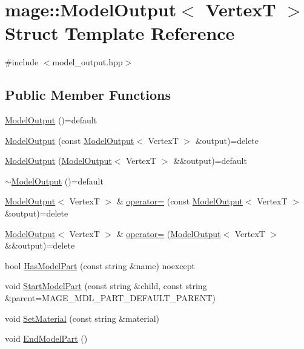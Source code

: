 \hypertarget{structmage_1_1_model_output}{}\section{mage\+:\+:Model\+Output$<$ VertexT $>$ Struct Template Reference}
\label{structmage_1_1_model_output}


{\ttfamily \#include $<$model\+\_\+output.\+hpp$>$}

\subsection*{Public Member Functions}
\begin{DoxyCompactItemize}
\item 
\hyperlink{structmage_1_1_model_output_a7d64b57d8207968541eb9c6da6ef0163}{Model\+Output} ()=default
\item 
\hyperlink{structmage_1_1_model_output_aac808e40a66f33da4ea28ebb7443623d}{Model\+Output} (const \hyperlink{structmage_1_1_model_output}{Model\+Output}$<$ VertexT $>$ \&output)=delete
\item 
\hyperlink{structmage_1_1_model_output_a20faa6e5b76ec7903a09e222e61e5353}{Model\+Output} (\hyperlink{structmage_1_1_model_output}{Model\+Output}$<$ VertexT $>$ \&\&output)=default
\item 
\hyperlink{structmage_1_1_model_output_a69a7f27486ad287943cbf973107ad8e1}{$\sim$\+Model\+Output} ()=default
\item 
\hyperlink{structmage_1_1_model_output}{Model\+Output}$<$ VertexT $>$ \& \hyperlink{structmage_1_1_model_output_ada52bf380c0259a0d7ef855457e5a9da}{operator=} (const \hyperlink{structmage_1_1_model_output}{Model\+Output}$<$ VertexT $>$ \&output)=delete
\item 
\hyperlink{structmage_1_1_model_output}{Model\+Output}$<$ VertexT $>$ \& \hyperlink{structmage_1_1_model_output_a5e368e3ae8a52d329f8d9b5f1c4b9d03}{operator=} (\hyperlink{structmage_1_1_model_output}{Model\+Output}$<$ VertexT $>$ \&\&output)=delete
\item 
bool \hyperlink{structmage_1_1_model_output_a90c6d42d13813b9c340bd1a250276a8d}{Has\+Model\+Part} (const string \&name) noexcept
\item 
void \hyperlink{structmage_1_1_model_output_a9e4d94547fbc318961d8c695149cdf14}{Start\+Model\+Part} (const string \&child, const string \&parent=M\+A\+G\+E\+\_\+\+M\+D\+L\+\_\+\+P\+A\+R\+T\+\_\+\+D\+E\+F\+A\+U\+L\+T\+\_\+\+P\+A\+R\+E\+NT)
\item 
void \hyperlink{structmage_1_1_model_output_abd614f9f2e9f9dbc0b2c354ee37f2998}{Set\+Material} (const string \&material)
\item 
void \hyperlink{structmage_1_1_model_output_a5df0c4240b1fac61ac0cdbf9766bb98d}{End\+Model\+Part} ()
\end{DoxyCompactItemize}
